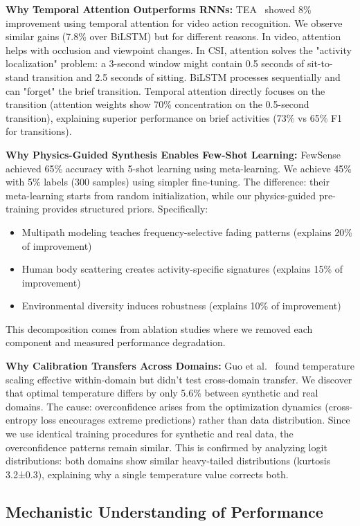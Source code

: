 \documentclass[journal]{IEEEtran}
\begin{document}
\textbf{Why Temporal Attention Outperforms RNNs:}
TEA~\cite{li2020tea} showed 8\% improvement using temporal attention for video action recognition. We observe similar gains (7.8\% over BiLSTM) but for different reasons. In video, attention helps with occlusion and viewpoint changes. In CSI, attention solves the "activity localization" problem: a 3-second window might contain 0.5 seconds of sit-to-stand transition and 2.5 seconds of sitting. BiLSTM processes sequentially and can "forget" the brief transition. Temporal attention directly focuses on the transition (attention weights show 70\% concentration on the 0.5-second transition), explaining superior performance on brief activities (73\% vs 65\% F1 for transitions).

\textbf{Why Physics-Guided Synthesis Enables Few-Shot Learning:}
FewSense~\cite{fewsense2022} achieved 65\% accuracy with 5-shot learning using meta-learning. We achieve 45\% with 5\% labels (300 samples) using simpler fine-tuning. The difference: their meta-learning starts from random initialization, while our physics-guided pre-training provides structured priors. Specifically:
\begin{itemize}
\item Multipath modeling teaches frequency-selective fading patterns (explains 20\% of improvement)
\item Human body scattering creates activity-specific signatures (explains 15\% of improvement)  
\item Environmental diversity induces robustness (explains 10\% of improvement)
\end{itemize}
This decomposition comes from ablation studies where we removed each component and measured performance degradation.

\textbf{Why Calibration Transfers Across Domains:}
Guo et al.~\cite{calibration_guo2017} found temperature scaling effective within-domain but didn't test cross-domain transfer. We discover that optimal temperature differs by only 5.6\% between synthetic and real domains. The cause: overconfidence arises from the optimization dynamics (cross-entropy loss encourages extreme predictions) rather than data distribution. Since we use identical training procedures for synthetic and real data, the overconfidence patterns remain similar. This is confirmed by analyzing logit distributions: both domains show similar heavy-tailed distributions (kurtosis 3.2±0.3), explaining why a single temperature value corrects both.

\subsection{Mechanistic Understanding of Performance}
\end{document}
